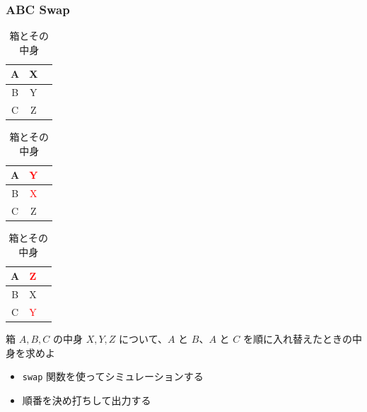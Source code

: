 \documentclass[t, aspectratio=169, dvipdfmx]{beamer}
\begin{document}
\begin{frame}[c]
\end{frame}
\begin{frame}[containsverbatim]
  \frametitle{ABC Swap}
  \begin{table}
    \caption{箱とその中身}
    \begin{minipage}{0.3\hsize}
      \begin{center}
        \begin{tabular}{|c|c|c|} \hline
          A & X \\ \hline
          B & Y \\ \hline
          C & Z \\ \hline
        \end{tabular}
      \end{center}
    \end{minipage}
    \begin{minipage}{0.3\hsize}
      \begin{center}
        \begin{tabular}{|c|c|c|} \hline
          A & \textcolor{red}{Y} \\ \hline
          B & \textcolor{red}{X} \\ \hline
          C & Z \\ \hline
        \end{tabular}
      \end{center}
    \end{minipage}
    \begin{minipage}{0.3\hsize}
      \begin{center}
        \begin{tabular}{|c|c|c|} \hline
          A & \textcolor{red}{Z} \\ \hline
          B & X \\ \hline
          C & \textcolor{red}{Y} \\ \hline
        \end{tabular}
      \end{center}
    \end{minipage}
  \end{table}
  箱 $A,B,C$ の中身 $X,Y,Z$ について、$A$ と $B$、$A$ と $C$ を順に入れ替えたときの中身を求めよ
  \begin{itemize}
    \item \verb|swap| 関数を使ってシミュレーションする
    \item 順番を決め打ちして出力する
  \end{itemize}
\end{frame}
\end{document}
